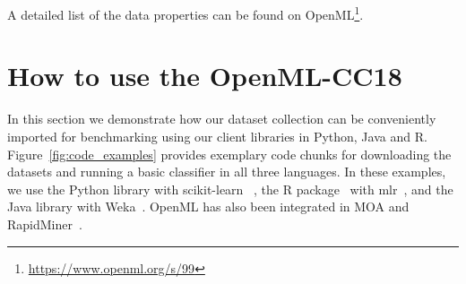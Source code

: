 \documentclass[twoside,11pt]{article}
\begin{document}
\noindent
A detailed list of the data properties can be found on OpenML\footnote{ \url{https://www.openml.org/s/99}}. 




\section{How to use the OpenML-CC18}

In this section we demonstrate how our dataset collection can be conveniently imported for benchmarking using our client libraries in Python, Java and R. Figure~\ref{fig:code_examples} provides exemplary code chunks for downloading the datasets and running a basic classifier in all three languages. In these examples, we use the Python library with scikit-learn ~\citep{scikit-learn}, the R package~\citep{Casalicchio2017} with mlr~\citep{Bischl2016}, and the Java library with Weka~\citep{Hall2009}.
%
OpenML has also been integrated in MOA and RapidMiner~\citep{Rijn2015}. 
\end{document}
